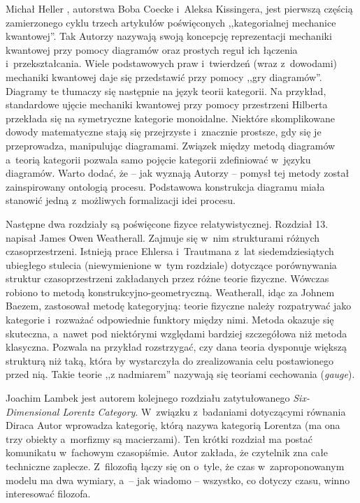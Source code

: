 \begin{recplenv}{Michał Heller}
, autorstwa Boba Coecke i~Aleksa Kissingera, jest pierwszą częścią zamierzonego cyklu trzech artykułów poświęconych ,,kategorialnej mechanice kwantowej''. Tak Autorzy nazywają swoją koncepcję reprezentacji mechaniki kwantowej przy pomocy diagramów oraz prostych reguł ich łączenia i~przekształcania. Wiele podstawowych praw i~twierdzeń (wraz z~dowodami) mechaniki kwantowej daje się przedstawić przy pomocy ,,gry diagramów''. Diagramy te tłumaczy się następnie na język teorii kategorii. Na przykład, standardowe ujęcie mechaniki kwantowej przy pomocy przestrzeni Hilberta przekłada się na symetryczne kategorie monoidalne. Niektóre skomplikowane dowody matematyczne stają się przejrzyste i~znacznie prostsze, gdy się je przeprowadza, manipulując diagramami. Związek między metodą diagramów a~teorią kategorii pozwala samo pojęcie kategorii zdefiniować w~języku diagramów. Warto dodać, że -- jak wyznają Autorzy -- pomysł tej metody został zainspirowany ontologią procesu. Podstawowa konstrukcja diagramu miała stanowić jedną z~możliwych formalizacji idei procesu.

Następne dwa rozdziały są poświęcone fizyce relatywistycznej. Rozdział 13.  napisał \mbox{James} Owen Weatherall. Zajmuje się w~nim strukturami różnych czasoprzestrzeni. Istnieją prace Ehlersa i~Trautmana z~lat siedemdziesiątych ubiegłego stulecia (niewymienione w~tym rozdziale) dotyczące porównywania struktur czasoprzestrzeni zakładanych przez różne teorie fizyczne. Wówczas robiono to metodą konstrukcyjno-geometryczną. Weatherall, idąc za Johnem Baezem, zastosował metodę kategoryjną: teorie fizyczne należy rozpatrywać jako kategorie i~rozważać odpowiednie funktory między nimi. Metoda okazuje się skuteczna, a~nawet pod niektórymi względami bardziej szczegółowa niż metoda klasyczna. Pozwala na przykład rozstrzygać, czy dana teoria dysponuje większą strukturą niż taką, która by wystarczyła do zrealizowania celu postawionego przed nią. Takie teorie ,,z nadmiarem'' nazywają się teoriami cechowania (\textit{gauge}).

Joachim Lambek jest autorem kolejnego rozdziału zatytułowanego \textit{Six-Dimensional Lorentz Category}. W~związku z~badaniami dotyczącymi równania Diraca Autor wprowadza kategorię, którą nazywa kategorią Lorentza (ma ona trzy obiekty a~morfizmy są macierzami). Ten krótki rozdział ma postać komunikatu w~fachowym czasopiśmie. Autor zakłada, że czytelnik zna całe techniczne zaplecze. Z~filozofią łączy się on o~tyle, że czas w~zaproponowanym modelu ma dwa wymiary, a~-- jak wiadomo -- wszystko, co dotyczy czasu, winno interesować filozofa.


\end{recplenv}

